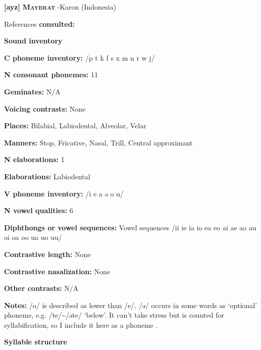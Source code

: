 \textbf{[ayz]}   \textbf{\textsc{Maybrat}}  -Karon (Indonesia)



References \textbf{consulted:} \citet{Dol2007}



\textbf{Sound inventory}



\textbf{C phoneme inventory:} /p t k f s x m n r w j/



\textbf{N consonant phonemes:} 11



\textbf{Geminates:} N/A



\textbf{Voicing contrasts:} None



\textbf{Places:} Bilabial, Labiodental, Alveolar, Velar



\textbf{Manners:} Stop, Fricative, Nasal, Trill, Central approximant



\textbf{N elaborations:} 1



\textbf{Elaborations:} Labiodental



\textbf{V phoneme inventory:} /i e a ə o u/



\textbf{N vowel qualities:} 6



\textbf{Diphthongs or vowel sequences:} Vowel sequences /ii ie ia io ea eo ai ae ao au oi oa oo ua uo uu/



\textbf{Contrastive length:} None



\textbf{Contrastive nasalization:} None



\textbf{Other contrasts:} N/A



\textbf{Notes:} /o/ is described as lower than /e/. /ə/ occurs in some words as ‘optional’ phoneme, e.g. /te/{\textasciitilde}/əte/ ‘below’. It can’t take stress but is counted for syllabification, so I include it here as a phoneme \citep[15-18]{Dol2007}.



\textbf{Syllable structure}



